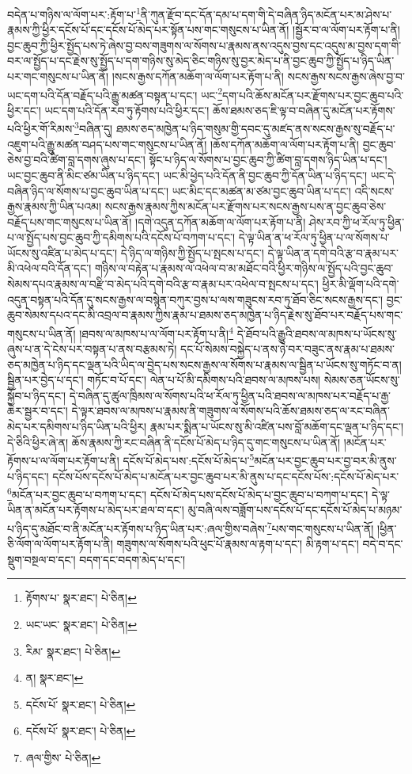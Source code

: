 བདེན་པ་གཉིས་ལ་ལོག་པར་:རྟོག་པ་\footnote{རྟོགས་པ་  སྣར་ཐང་།  པེ་ཅིན། }ནི་ཀུན་རྫོབ་དང་དོན་དམ་པ་དག་གི་དེ་བཞིན་ཉིད་མངོན་པར་མ་ཤེས་པ་རྣམས་ཀྱི་ཕྱིར་དངོས་པོ་དང་དངོས་པོ་མེད་པར་སྟོན་པས་གང་གསུངས་པ་ཡིན་ནོ། །སྦྱོར་བ་ལ་ལོག་པར་རྟོག་པ་ནི། བྱང་ཆུབ་ཀྱི་ཕྱིར་སྤྱོད་པས་ཏེ་ཞེས་བྱ་བས་གཟུགས་ལ་སོགས་པ་རྣམས་ནས་འདུས་བྱས་དང་འདུས་མ་བྱས་དག་གི་བར་ལ་སྤྱོད་པ་དང་རྗེས་སུ་སྤྱོད་པ་དག་གཉིས་སུ་མེད་ཅིང་གཉིས་སུ་བྱར་མེད་པ་ནི་བྱང་ཆུབ་ཀྱི་སྤྱོད་པ་ཉིད་ཡིན་པར་གང་གསུངས་པ་ཡིན་ནོ། །སངས་རྒྱས་དཀོན་མཆོག་ལ་ལོག་པར་རྟོག་པ་ནི། སངས་རྒྱས་སངས་རྒྱས་ཞེས་བྱ་བ་ཡང་དག་པའི་དོན་བརྗོད་པའི་རྒྱུ་མཚན་བསྟན་པ་དང་། ཡང་\footnote{ཡང་ཡང་  སྣར་ཐང་།  པེ་ཅིན། }དག་པའི་ཆོས་མངོན་པར་རྫོགས་པར་བྱང་ཆུབ་པའི་ཕྱིར་དང་། ཡང་དག་པའི་དོན་རབ་ཏུ་རྟོགས་པའི་ཕྱིར་དང་། ཆོས་ཐམས་ཅད་ཇི་ལྟ་བ་བཞིན་དུ་མངོན་པར་རྟོགས་པའི་ཕྱིར་གོ་རིམས་\footnote{རིམ་  སྣར་ཐང་།  པེ་ཅིན། }བཞིན་དུ། ཐམས་ཅད་མཁྱེན་པ་ཉིད་གསུམ་གྱི་དབང་དུ་མཛད་ནས་སངས་རྒྱས་སུ་བརྗོད་པ་འཇུག་པའི་རྒྱུ་མཚན་བཤད་པས་གང་གསུངས་པ་ཡིན་ནོ། །ཆོས་དཀོན་མཆོག་ལ་ལོག་པར་རྟོག་པ་ནི། བྱང་ཆུབ་ཅེས་བྱ་བའི་ཚིག་བླ་དགས་ཞུས་པ་དང་། སྟོང་པ་ཉིད་ལ་སོགས་པ་བྱང་ཆུབ་ཀྱི་ཚིག་བླ་དགས་ཉིད་ཡིན་པ་དང་། ཡང་བྱང་ཆུབ་ནི་མིང་ཙམ་ཡིན་པ་ཉིད་དང་། ཡང་མི་ཕྱེད་པའི་དོན་ནི་བྱང་ཆུབ་ཀྱི་དོན་ཡིན་པ་ཉིད་དང་། ཡང་དེ་བཞིན་ཉིད་ལ་སོགས་པ་བྱང་ཆུབ་ཡིན་པ་དང་། ཡང་མིང་དང་མཚན་མ་ཙམ་བྱང་ཆུབ་ཡིན་པ་དང་། འདི་སངས་རྒྱས་རྣམས་ཀྱི་ཡིན་པའམ། སངས་རྒྱས་རྣམས་ཀྱིས་མངོན་པར་རྫོགས་པར་སངས་རྒྱས་པས་ན་བྱང་ཆུབ་ཅེས་བརྗོད་པས་གང་གསུངས་པ་ཡིན་ནོ། །དགེ་འདུན་དཀོན་མཆོག་ལ་ལོག་པར་རྟོག་པ་ནི། ཤེས་རབ་ཀྱི་ཕ་རོལ་ཏུ་ཕྱིན་པ་ལ་སྤྱོད་པས་བྱང་ཆུབ་ཀྱི་དམིགས་པའི་དངོས་པོ་བཀག་པ་དང་། དེ་ལྟ་ཡིན་ན་ཕ་རོལ་ཏུ་ཕྱིན་པ་ལ་སོགས་པ་ཡོངས་སུ་འཛིན་པ་མེད་པ་དང་། དེ་ཉིད་ལ་གཉིས་ཀྱི་སྤྱོད་པ་སྤངས་པ་དང་། དེ་ལྟ་ཡིན་ན་དགེ་བའི་རྩ་བ་རྣམ་པར་མི་འཕེལ་བའི་དོན་དང་། གཉིས་ལ་བརྟེན་པ་རྣམས་ལ་འཕེལ་བ་མ་མཐོང་བའི་ཕྱིར་གཉིས་ལ་སྤྱོད་པའི་བྱང་ཆུབ་སེམས་དཔའ་རྣམས་ལ་བརྫི་བ་མེད་པའི་དགེ་བའི་རྩ་བ་རྣམ་པར་འཕེལ་བ་སྤངས་པ་དང་། ཕྱིར་མི་ལྡོག་པའི་དགེ་འདུན་བསྟན་པའི་དོན་དུ་སངས་རྒྱས་ལ་བསྙེན་བཀུར་བྱས་པ་ལས་གཟུངས་རབ་ཏུ་ཐོབ་ཅིང་སངས་རྒྱས་དང་། བྱང་ཆུབ་སེམས་དཔའ་དང་མི་འབྲལ་བ་རྣམས་ཀྱིས་རྣམ་པ་ཐམས་ཅད་མཁྱེན་པ་ཉིད་རྗེས་སུ་ཐོབ་པར་བརྗོད་པས་གང་གསུངས་པ་ཡིན་ནོ། །ཐབས་ལ་མཁས་པ་ལ་ལོག་པར་རྟོག་པ་ནི།\footnote{ན།  སྣར་ཐང་། } དེ་ཐོབ་པའི་རྒྱུའི་ཐབས་ལ་མཁས་པ་ཡོངས་སུ་ཞུས་པ་ན་དེ་ངེས་པར་བསྟན་པ་ནས་བརྩམས་ཏེ། དང་པོ་སེམས་བསྐྱེད་པ་ནས་ཉེ་བར་བཟུང་ནས་རྣམ་པ་ཐམས་ཅད་མཁྱེན་པ་ཉིད་དང་ལྡན་པའི་ཡིད་ལ་བྱེད་པས་སངས་རྒྱས་ལ་སོགས་པ་རྣམས་ལ་སྦྱིན་པ་ཡོངས་སུ་གཏོང་བ་ན། སྦྱིན་པར་བྱེད་པ་དང་། གཏོང་བ་པོ་དང་། ལེན་པ་པོ་མི་དམིགས་པའི་ཐབས་ལ་མཁས་པས། སེམས་ཅན་ཡོངས་སུ་སྐྱོབ་པ་ཉིད་དང་། དེ་བཞིན་དུ་ཚུལ་ཁྲིམས་ལ་སོགས་པའི་ཕ་རོལ་ཏུ་ཕྱིན་པའི་ཐབས་ལ་མཁས་པར་བརྗོད་པ་རྒྱ་ཆེར་སྦྱར་བ་དང་། དེ་ལྟར་ཐབས་ལ་མཁས་པ་རྣམས་ནི་གཟུགས་ལ་སོགས་པའི་ཆོས་ཐམས་ཅད་ལ་རང་བཞིན་མེད་པར་དམིགས་པ་ཉིད་ཡིན་པའི་ཕྱིར། རྣམ་པར་སྨིན་པ་ཡོངས་སུ་མི་འཛིན་པས་བློ་མཆོག་དང་ལྡན་པ་ཉིད་དང་། དེ་ཅིའི་ཕྱིར་ཞེ་ན། ཆོས་རྣམས་ཀྱི་རང་བཞིན་ནི་དངོས་པོ་མེད་པ་ཉིད་དུ་གང་གསུངས་པ་ཡིན་ནོ། །མངོན་པར་རྟོགས་པ་ལ་ལོག་པར་རྟོག་པ་ནི། དངོས་པོ་མེད་པས་:དངོས་པོ་མེད་པ་\footnote{དངོས་པོ་  སྣར་ཐང་།  པེ་ཅིན། }མངོན་པར་བྱང་ཆུབ་པར་བྱ་བར་མི་ནུས་པ་ཉིད་དང་། དངོས་པོས་དངོས་པོ་མེད་པ་མངོན་པར་བྱང་ཆུབ་པར་མི་ནུས་པ་དང་དངོས་པོས་:དངོས་པོ་མེད་པར་\footnote{དངོས་པོ་  སྣར་ཐང་།  པེ་ཅིན། }མངོན་པར་བྱང་ཆུབ་པ་བཀག་པ་དང་། དངོས་པོ་མེད་པས་དངོས་པོ་མེད་པ་བྱང་ཆུབ་པ་བཀག་པ་དང་། དེ་ལྟ་ཡིན་ན་མངོན་པར་རྟོགས་པ་མེད་པར་ཐལ་བ་དང་། མུ་བཞི་ལས་བཟློག་པས་དངོས་པོ་དང་དངོས་པོ་མེད་པ་མཉམ་པ་ཉིད་དུ་མཐོང་བ་ནི་མངོན་པར་རྟོགས་པ་ཉིད་ཡིན་པར་:ཞལ་གྱིས་བཞེས་\footnote{ཞལ་གྱིས་  པེ་ཅིན། }པས་གང་གསུངས་པ་ཡིན་ནོ། །ཕྱིན་ཅི་ལོག་ལ་ལོག་པར་རྟོག་པ་ནི། གཟུགས་ལ་སོགས་པའི་ཕུང་པོ་རྣམས་ལ་རྟག་པ་དང་། མི་རྟག་པ་དང་། བདེ་བ་དང་སྡུག་བསྔལ་བ་དང་། བདག་དང་བདག་མེད་པ་དང་། 
